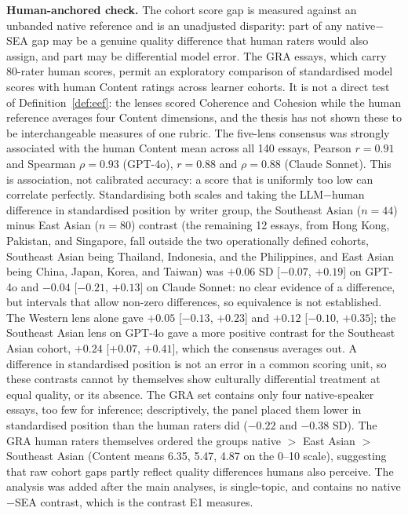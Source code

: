 \textbf{Human-anchored check.} The cohort score gap is measured
against an unbanded native reference and is an unadjusted disparity:
part of any native$-$SEA gap may be a genuine quality difference
that human raters would also assign, and part may be differential
model error. The GRA essays, which carry 80-rater human scores,
permit an exploratory comparison of standardised model scores with
human Content ratings across learner cohorts. It is not a direct
test of Definition~\ref{def:eef}: the lenses scored Coherence and
Cohesion while the human reference averages four Content
dimensions, and the thesis has not shown these to be interchangeable
measures of one rubric. The five-lens consensus was strongly
associated with the human Content mean across all 140 essays,
Pearson $r = 0.91$ and Spearman $\rho = 0.93$ (GPT-4o), $r = 0.88$
and $\rho = 0.88$ (Claude Sonnet). This is association, not
calibrated accuracy: a score that is uniformly too low can correlate
perfectly. Standardising both scales and taking the LLM$-$human
difference in standardised position by writer group, the Southeast
Asian ($n = 44$) minus East Asian ($n = 80$) contrast (the remaining
12 essays, from Hong Kong, Pakistan, and Singapore, fall outside the
two operationally defined cohorts, Southeast Asian being Thailand,
Indonesia, and the Philippines, and East Asian being China, Japan,
Korea, and Taiwan) was $+0.06$ SD [$-0.07$, $+0.19$] on GPT-4o and $-0.04$
[$-0.21$, $+0.13$] on Claude Sonnet: no clear evidence of a
difference, but intervals that allow non-zero differences, so
equivalence is not established. The Western lens alone gave $+0.05$
[$-0.13$, $+0.23$] and $+0.12$ [$-0.10$, $+0.35$]; the Southeast
Asian lens on GPT-4o gave a more positive contrast for the Southeast
Asian cohort, $+0.24$ [$+0.07$, $+0.41$], which the consensus
averages out. A difference in standardised position is not an error
in a common scoring unit, so these contrasts cannot by themselves
show culturally differential treatment at equal quality, or its
absence. The GRA set contains only four native-speaker essays, too
few for inference; descriptively, the panel placed them lower in
standardised position than the human raters did ($-0.22$ and
$-0.38$ SD). The GRA human raters themselves ordered the groups
native $>$ East Asian $>$ Southeast Asian (Content means 6.35,
5.47, 4.87 on the 0--10 scale), suggesting that raw cohort gaps
partly reflect quality differences humans also perceive. The
analysis was added after the main analyses, is single-topic, and
contains no native$-$SEA contrast, which is the contrast E1
measures.

